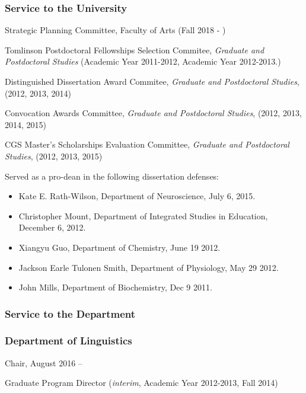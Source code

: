\documentclass[11pt]{article}
\begin{document}
\subsubsection*{Service to the University}

Strategic Planning Committee, Faculty of Arts (Fall 2018 - )

Tomlinson Postdoctoral Fellowships Selection Commitee, \textit{Graduate and
  Postdoctoral Studies} (Academic Year 2011-2012, Academic Year 2012-2013.)

Distinguished Dissertation Award Commitee, \textit{Graduate and
  Postdoctoral Studies}, (2012, 2013, 2014)

Convocation Awards Committee, \textit{Graduate and
  Postdoctoral Studies}, (2012, 2013, 2014, 2015)

CGS Master's Scholarships Evaluation Committee, \textit{Graduate and
  Postdoctoral Studies}, (2012, 2013, 2015)

Served as a pro-dean in the following dissertation defenses:

\begin{itemize}
\item Kate E. Rath-Wilson, Department of Neuroscience, July 6, 2015.
\item Christopher Mount, Department of Integrated Studies in
  Education, December 6, 2012.
\item Xiangyu Guo, Department of Chemistry, June 19 2012.
\item Jackson Earle Tulonen Smith, Department of Physiology, May 29 2012.
\item John Mills, Department of Biochemistry, Dec 9 2011.

\end{itemize}

\subsubsection*{Service to the Department}

\subsubsection*{Department of Linguistics}

Chair, August 2016 --

Graduate Program Director (\textit{interim}, Academic Year 2012-2013, Fall 2014)
\end{document}
